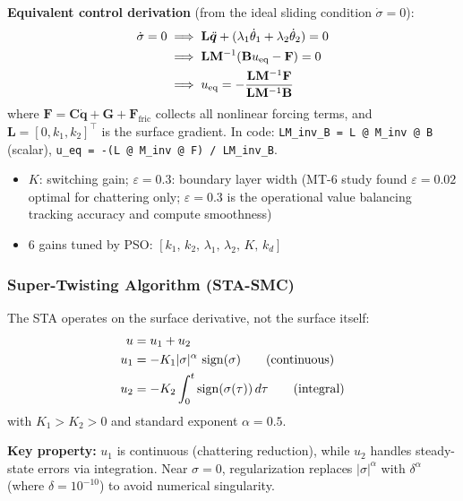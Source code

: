 \documentclass[11pt, a4paper]{article}
\newcommand{\vq}{\boldsymbol{q}}
\newcommand{\sign}{\operatorname{sign}}
\begin{document}
\textbf{Equivalent control derivation} (from the ideal sliding condition $\dot{\sigma}=0$):
\begin{align}
  \dot{\sigma} = 0
  &\implies \mathbf{L}\ddot{\vq} + (\lambda_1\dot{\theta}_1 + \lambda_2\dot{\theta}_2) = 0 \notag\\
  &\implies \mathbf{L}\mathbf{M}^{-1}(\mathbf{B}u_\text{eq} - \mathbf{F}) = 0 \notag\\
  &\implies u_\text{eq} = -\frac{\mathbf{L}\mathbf{M}^{-1}\mathbf{F}}
                                {\mathbf{L}\mathbf{M}^{-1}\mathbf{B}}
  \label{eq:ueq}
\end{align}
where $\mathbf{F} = \mathbf{C}\dot{\vq} + \mathbf{G} + \mathbf{F}_\text{fric}$
collects all nonlinear forcing terms, and
$\mathbf{L} = [0, k_1, k_2]^\top$ is the surface gradient.
In code: \texttt{LM\_inv\_B = L @ M\_inv @ B} (scalar),
\texttt{u\_eq = -(L @ M\_inv @ F) / LM\_inv\_B}.

\begin{itemize}[noitemsep]
  \item $K$: switching gain; $\varepsilon = 0.3$: boundary layer width
        (MT-6 study found $\varepsilon = 0.02$ optimal for chattering only;
        $\varepsilon = 0.3$ is the operational value balancing tracking
        accuracy and compute smoothness)
  \item 6 gains tuned by PSO: $[k_1,\, k_2,\, \lambda_1,\, \lambda_2,\, K,\, k_d]$
\end{itemize}

\subsubsection{Super-Twisting Algorithm (STA-SMC)}

The STA operates on the surface derivative, not the surface itself:
\begin{align}
  u     &= u_1 + u_2 \label{eq:sta}\\
  u_1   &= -K_1 |\sigma|^{\alpha}\,\sign(\sigma) \qquad \text{(continuous)} \notag\\
  u_2   &= -K_2 \int_0^t \sign(\sigma(\tau))\,d\tau \qquad \text{(integral)} \notag
\end{align}
with $K_1 > K_2 > 0$ and standard exponent $\alpha = 0.5$.

\textbf{Key property:} $u_1$ is continuous (chattering reduction), while
$u_2$ handles steady-state errors via integration.
Near $\sigma = 0$, regularization replaces $|\sigma|^\alpha$ with
$\delta^\alpha$ (where $\delta = 10^{-10}$) to avoid numerical singularity.
\end{document}
